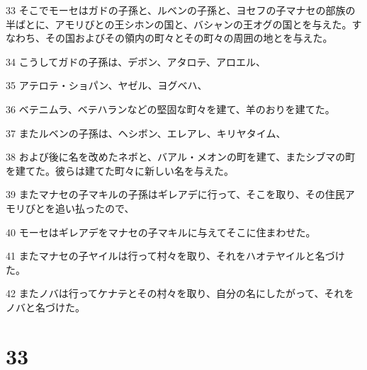 \par 33 そこでモーセはガドの子孫と、ルベンの子孫と、ヨセフの子マナセの部族の半ばとに、アモリびとの王シホンの国と、バシャンの王オグの国とを与えた。すなわち、その国およびその領内の町々とその町々の周囲の地とを与えた。
\par 34 こうしてガドの子孫は、デボン、アタロテ、アロエル、
\par 35 アテロテ・ショパン、ヤゼル、ヨグベハ、
\par 36 ベテニムラ、ベテハランなどの堅固な町々を建て、羊のおりを建てた。
\par 37 またルベンの子孫は、ヘシボン、エレアレ、キリヤタイム、
\par 38 および後に名を改めたネボと、バアル・メオンの町を建て、またシブマの町を建てた。彼らは建てた町々に新しい名を与えた。
\par 39 またマナセの子マキルの子孫はギレアデに行って、そこを取り、その住民アモリびとを追い払ったので、
\par 40 モーセはギレアデをマナセの子マキルに与えてそこに住まわせた。
\par 41 またマナセの子ヤイルは行って村々を取り、それをハオテヤイルと名づけた。
\par 42 またノバは行ってケナテとその村々を取り、自分の名にしたがって、それをノバと名づけた。

\chapter{33}

